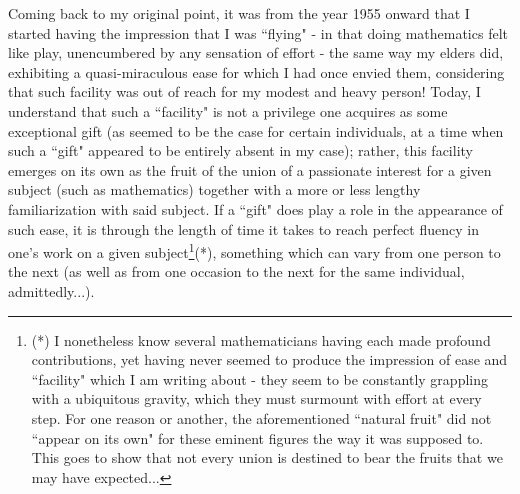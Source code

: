Coming back to my original point, it was from the year 1955 onward that I started having the impression that I was ``flying" - in that doing mathematics felt like play, unencumbered by any sensation of effort - the same way my elders did, exhibiting a quasi-miraculous ease for which I had once envied them, considering that such facility was out of reach for my modest and heavy person! Today, I understand that such a ``facility" is not a privilege one acquires as some exceptional gift (as seemed to be the case for certain individuals, at a time when such a ``gift" appeared to be entirely absent in my case); rather, this facility emerges on its own as the fruit of the union of a passionate interest for a given subject (such as mathematics) together with a more or less lengthy familiarization with said subject. If a ``gift" does play a role in the appearance of such ease, it is through the length of time it takes to reach perfect fluency in one's work on a given subject\footnote{(*) I nonetheless know several mathematicians having each made profound contributions, yet having never seemed to produce the impression of ease and ``facility" which I am writing about - they seem to be constantly grappling with a ubiquitous gravity, which they must surmount with effort at every step. For one reason or another, the aforementioned ``natural fruit" did not ``appear on its own" for these eminent figures the way it was supposed to. This goes to show that not every union is destined to bear the fruits that we may have expected...}(*), something which can vary from one person to the next (as well as from one occasion to the next for the same individual, admittedly...).

